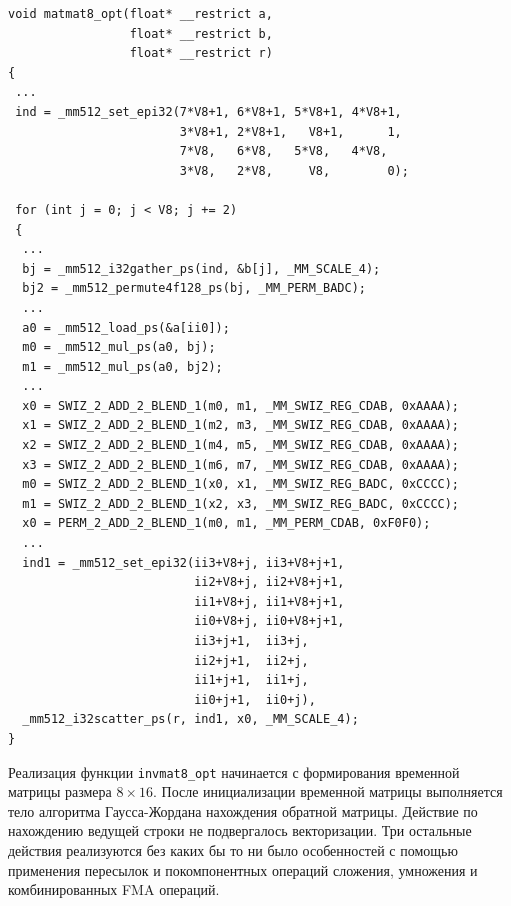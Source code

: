 \begin{singlespace}
\begin{lstlisting}[caption={Векторизованная версия перемножения \ \\ матриц размера $8 \times 8$.}, label={lst:text_4_small_matr_matmat_opt}]
void matmat8_opt(float* __restrict a,
                 float* __restrict b,
                 float* __restrict r)
{
 ...
 ind = _mm512_set_epi32(7*V8+1, 6*V8+1, 5*V8+1, 4*V8+1,
                        3*V8+1, 2*V8+1,   V8+1,      1,
                        7*V8,   6*V8,   5*V8,   4*V8,
                        3*V8,   2*V8,     V8,        0);

 for (int j = 0; j < V8; j += 2)
 {
  ...
  bj = _mm512_i32gather_ps(ind, &b[j], _MM_SCALE_4);
  bj2 = _mm512_permute4f128_ps(bj, _MM_PERM_BADC);
  ...
  a0 = _mm512_load_ps(&a[ii0]);
  m0 = _mm512_mul_ps(a0, bj);
  m1 = _mm512_mul_ps(a0, bj2);
  ...
  x0 = SWIZ_2_ADD_2_BLEND_1(m0, m1, _MM_SWIZ_REG_CDAB, 0xAAAA);
  x1 = SWIZ_2_ADD_2_BLEND_1(m2, m3, _MM_SWIZ_REG_CDAB, 0xAAAA);
  x2 = SWIZ_2_ADD_2_BLEND_1(m4, m5, _MM_SWIZ_REG_CDAB, 0xAAAA);
  x3 = SWIZ_2_ADD_2_BLEND_1(m6, m7, _MM_SWIZ_REG_CDAB, 0xAAAA);
  m0 = SWIZ_2_ADD_2_BLEND_1(x0, x1, _MM_SWIZ_REG_BADC, 0xCCCC);
  m1 = SWIZ_2_ADD_2_BLEND_1(x2, x3, _MM_SWIZ_REG_BADC, 0xCCCC);
  x0 = PERM_2_ADD_2_BLEND_1(m0, m1, _MM_PERM_CDAB, 0xF0F0);
  ...
  ind1 = _mm512_set_epi32(ii3+V8+j, ii3+V8+j+1,
                          ii2+V8+j, ii2+V8+j+1,
                          ii1+V8+j, ii1+V8+j+1,
                          ii0+V8+j, ii0+V8+j+1,
                          ii3+j+1,  ii3+j,
                          ii2+j+1,  ii2+j,
                          ii1+j+1,  ii1+j,
                          ii0+j+1,  ii0+j),
  _mm512_i32scatter_ps(r, ind1, x0, _MM_SCALE_4);
}
\end{lstlisting}
\end{singlespace}

Реализация функции \texttt{invmat8\_opt} начинается с формирования временной матрицы размера $8 \times 16$.
После инициализации временной матрицы выполняется тело алгоритма Гаусса-Жордана нахождения обратной матрицы.
Действие по нахождению ведущей строки не подвергалось векторизации.
Три остальные действия реализуются без каких бы то ни было особенностей с помощью применения пересылок и покомпонентных операций сложения, умножения и комбинированных FMA\label{abbr:fma-2} операций.

